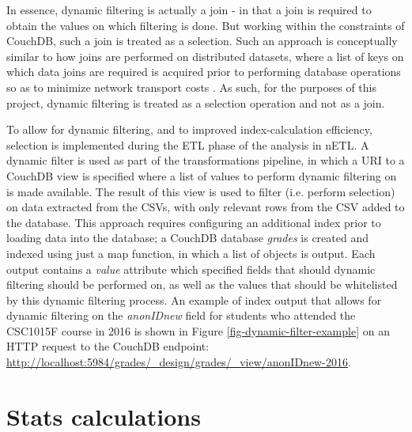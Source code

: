 In essence, dynamic filtering is actually a join - in that a join is required to obtain the values on which filtering is done. But working within the constraints of CouchDB, such a join is treated as a selection. Such an approach is conceptually similar to how joins are performed on distributed datasets, where a list of keys on which data joins are required is acquired prior to performing database operations so as to minimize network transport costs \cite{sonia2018}. As such, for the purposes of this project, dynamic filtering is treated as a selection operation and not as a join.

To allow for dynamic filtering, and to improved index-calculation efficiency, selection is implemented during the ETL phase of the analysis in nETL. A dynamic filter is used as part of the transformations pipeline, in which a URI to a CouchDB view is specified where a list of values to perform dynamic filtering on is made available. The result of this view is used to filter (i.e. perform selection) on data extracted from the CSVs, with only relevant rows from the CSV added to the database. This approach requires configuring an additional index prior to loading data into the database; a CouchDB database \textit{grades} is created and indexed using just a map function, in which a list of objects is output. Each output contains a \textit{value} attribute which specified fields that should dynamic filtering should be performed on, as well as the values that should be whitelisted by this dynamic filtering process. An example of index output that allows for dynamic filtering on the \textit{anonIDnew} field for students who attended the CSC1015F course in 2016 is shown in Figure \ref{fig-dynamic-filter-example} on an HTTP request to the CouchDB endpoint: \url{http://localhost:5984/grades/_design/grades/_view/anonIDnew-2016}.



\section{Stats calculations}
